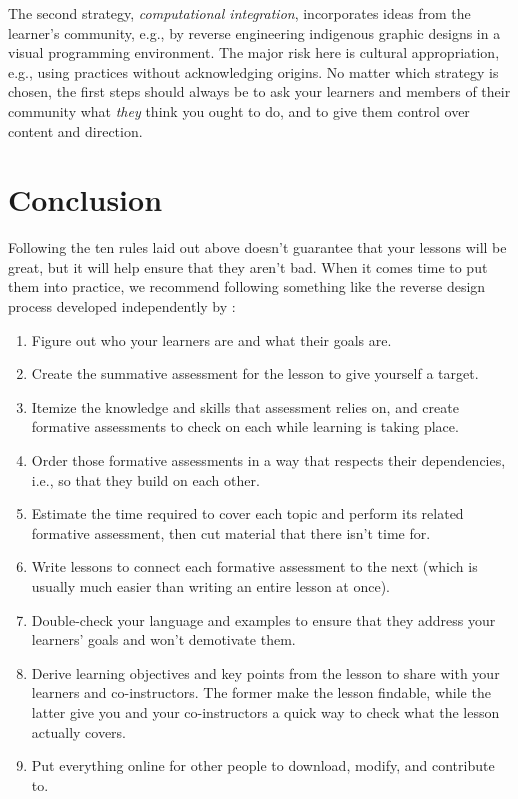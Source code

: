\documentclass[10pt,letterpaper]{article}
\begin{document}
The second strategy, \emph{computational integration}, incorporates ideas from
the learner's community, e.g., by reverse engineering indigenous graphic designs
in a visual programming environment.  The major risk here is cultural
appropriation, e.g., using practices without acknowledging origins.  No matter
which strategy is chosen, the first steps should always be to ask your learners
and members of their community what \emph{they} think you ought to do, and to
give them control over content and direction.

\section*{Conclusion}

Following the ten rules laid out above doesn't guarantee that your lessons will
be great, but it will help ensure that they aren't bad.  When it comes time to
put them into practice, we recommend following something like the reverse design
process developed independently by \cite{Wigg2005,Bigg2011,Fink2013}:

\begin{enumerate}

\item Figure out who your learners are and what their goals are.

\item Create the summative assessment for the lesson to give yourself a target.

\item Itemize the knowledge and skills that assessment relies on, and create
  formative assessments to check on each while learning is taking place.

\item Order those formative assessments in a way that respects their
  dependencies, i.e., so that they build on each other.

\item Estimate the time required to cover each topic and perform its related
  formative assessment, then cut material that there isn't time for.

\item Write lessons to connect each formative assessment to the next (which is
  usually much easier than writing an entire lesson at once).

\item Double-check your language and examples to ensure that they address
  your learners' goals and won't demotivate them.

\item Derive learning objectives and key points from the lesson to share with
  your learners and co-instructors.  The former make the lesson findable, while
  the latter give you and your co-instructors a quick way to check what the
  lesson actually covers.

\item Put everything online for other people to download, modify, and contribute
  to.
  
\end{enumerate}
\end{document}
